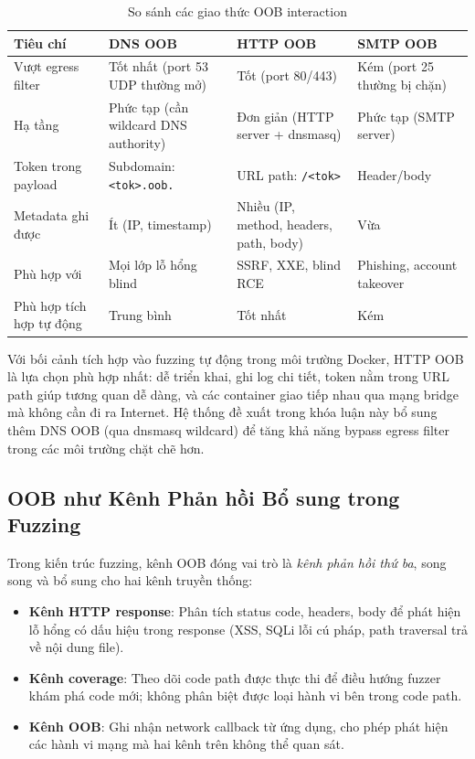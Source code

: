 \begin{table}[h]
\centering
\caption{So sánh các giao thức OOB interaction}
\label{tab:oob-protocols}
\begin{tabular}{|l|p{3.2cm}|p{3.2cm}|p{3.2cm}|}
\hline
\textbf{Tiêu chí}
    & \textbf{DNS OOB}
    & \textbf{HTTP OOB}
    & \textbf{SMTP OOB} \\
\hline
Vượt egress filter
    & Tốt nhất (port 53 UDP thường mở)
    & Tốt (port 80/443)
    & Kém (port 25 thường bị chặn)  \\
\hline
Hạ tầng
    & Phức tạp (cần wildcard DNS authority)
    & Đơn giản (HTTP server + dnsmasq)
    & Phức tạp (SMTP server)  \\
\hline
Token trong payload
    & Subdomain: \texttt{<tok>.oob.}
    & URL path: \texttt{/<tok>}
    & Header/body  \\
\hline
Metadata ghi được
    & Ít (IP, timestamp)
    & Nhiều (IP, method, headers, path, body)
    & Vừa  \\
\hline
Phù hợp với
    & Mọi lớp lỗ hổng blind
    & SSRF, XXE, blind RCE
    & Phishing, account takeover  \\
\hline
Phù hợp tích hợp tự động
    & Trung bình
    & Tốt nhất
    & Kém  \\
\hline
\end{tabular}
\end{table}

Với bối cảnh tích hợp vào fuzzing tự động trong môi trường Docker, HTTP OOB
là lựa chọn phù hợp nhất: dễ triển khai, ghi log chi tiết, token nằm trong
URL path giúp tương quan dễ dàng, và các container giao tiếp nhau qua mạng
bridge mà không cần đi ra Internet. Hệ thống đề xuất trong khóa luận này bổ
sung thêm DNS OOB (qua dnsmasq wildcard) để tăng khả năng bypass egress
filter trong các môi trường chặt chẽ hơn.

\subsection{OOB như Kênh Phản hồi Bổ sung trong Fuzzing}

Trong kiến trúc fuzzing, kênh OOB đóng vai trò là \emph{kênh phản hồi thứ
ba}, song song và bổ sung cho hai kênh truyền thống:

\begin{itemize}
    \item \textbf{Kênh HTTP response}: Phân tích status code, headers, body
    để phát hiện lỗ hổng có dấu hiệu trong response (XSS, SQLi lỗi cú pháp,
    path traversal trả về nội dung file).
    \item \textbf{Kênh coverage}: Theo dõi code path được thực thi để điều
    hướng fuzzer khám phá code mới; không phân biệt được loại hành vi bên
    trong code path.
    \item \textbf{Kênh OOB}: Ghi nhận network callback từ ứng dụng, cho phép
    phát hiện các hành vi mạng mà hai kênh trên không thể quan sát.
\end{itemize}

